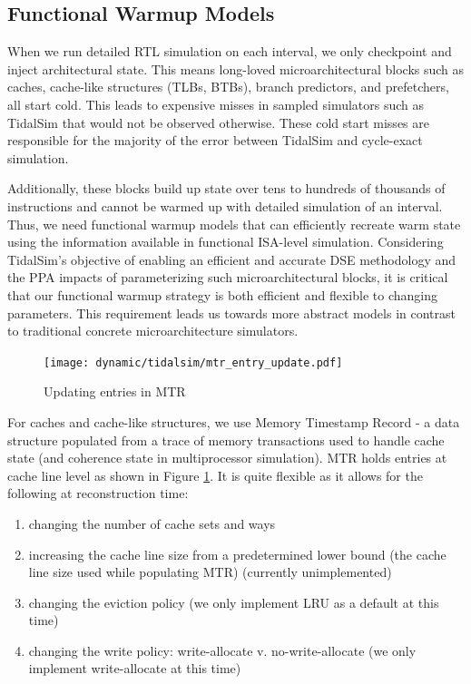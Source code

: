 \documentclass[sigplan,nonacm,10pt]{acmart}
\begin{document}
\subsection{Functional Warmup Models}




When we run detailed RTL simulation on each interval, we only checkpoint and inject architectural state. This means long-loved microarchitectural blocks such as caches, cache-like structures (TLBs, BTBs), branch predictors, and prefetchers, all start cold.
This leads to expensive misses in sampled simulators such as TidalSim that would not be observed otherwise. These cold start misses are responsible for the majority of the error between TidalSim and cycle-exact simulation.

Additionally, these blocks build up state over tens to hundreds of thousands of instructions and cannot be warmed up with detailed simulation of an interval. Thus, we need functional warmup models that can efficiently recreate warm state using the information available in functional ISA-level simulation.
Considering TidalSim's objective of enabling an efficient and accurate DSE methodology and the PPA impacts of parameterizing such microarchitectural blocks, it is critical that our functional warmup strategy is both efficient and flexible to changing parameters. This requirement leads us towards more abstract models in contrast to traditional concrete microarchitecture simulators.

\begin{figure}
  \texttt{[image: dynamic/tidalsim/mtr\_entry\_update.pdf]}
  \caption{Updating entries in MTR}
  \label{fig:mtr_entry_update}
\end{figure}

For caches and cache-like structures, we use Memory Timestamp Record \cite{barr2005accelerating} - a data structure populated from a trace of memory transactions used to handle cache state (and coherence state in multiprocessor simulation). MTR holds entries at cache line level as shown in Figure \ref{fig:mtr_entry_update}.
It is quite flexible as it allows for the following at reconstruction time:
\begin{enumerate}
  \item changing the number of cache sets and ways
  \item increasing the cache line size from a predetermined lower bound (the cache line size used while populating MTR) (currently unimplemented)
  \item changing the eviction policy (we only implement LRU as a default at this time)
  \item changing the write policy: write-allocate v. no-write-allocate (we only implement write-allocate at this time)
\end{enumerate}
\end{document}
